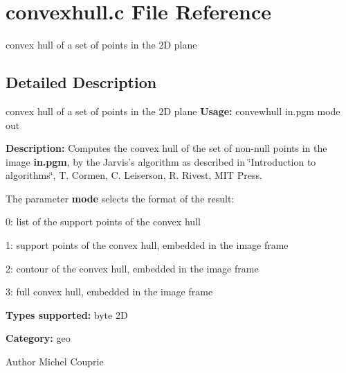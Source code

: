\section{convexhull.c File Reference}
\label{convexhull_8c}


convex hull of a set of points in the 2D plane  




\subsection{Detailed Description}
convex hull of a set of points in the 2D plane {\bfseries Usage:} convewhull in.pgm mode out

{\bfseries Description:} Computes the convex hull of the set of non-\/null points in the image {\bfseries in.pgm}, by the Jarvis's algorithm as described in \char`\"{}Introduction to algorithms\char`\"{}, T. Cormen, C. Leiserson, R. Rivest, MIT Press.

The parameter {\bfseries mode} selects the format of the result: \begin{DoxyItemize}
\item 0: list of the support points of the convex hull \item 1: support points of the convex hull, embedded in the image frame \item 2: contour of the convex hull, embedded in the image frame \item 3: full convex hull, embedded in the image frame\end{DoxyItemize}
{\bfseries Types supported:} byte 2D

{\bfseries Category:} geo

\begin{DoxyAuthor}{Author}
Michel Couprie 
\end{DoxyAuthor}
